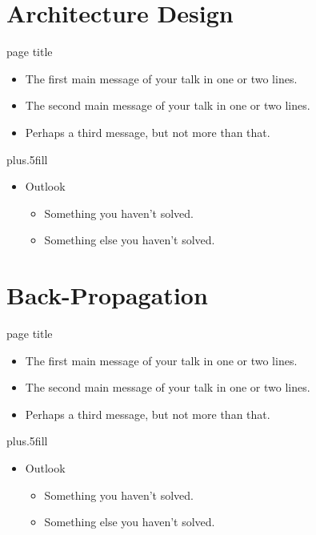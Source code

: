 \documentclass{beamer}
\begin{document}
\section{Architecture Design}

\begin{frame}{page title}
	
	\begin{itemize}
		\item
		The \alert{first main message} of your talk in one or two lines.
		\item
		The \alert{second main message} of your talk in one or two lines.
		\item
		Perhaps a \alert{third message}, but not more than that.
	\end{itemize}
	
	\vskip0pt plus.5fill
	\begin{itemize}
		\item
		Outlook
		\begin{itemize}
			\item
			Something you haven't solved.
			\item
			Something else you haven't solved.
		\end{itemize}
	\end{itemize}
\end{frame}

\section{Back-Propagation}

\begin{frame}{page title}
	
	\begin{itemize}
		\item
		The \alert{first main message} of your talk in one or two lines.
		\item
		The \alert{second main message} of your talk in one or two lines.
		\item
		Perhaps a \alert{third message}, but not more than that.
	\end{itemize}
	
	\vskip0pt plus.5fill
	\begin{itemize}
		\item
		Outlook
		\begin{itemize}
			\item
			Something you haven't solved.
			\item
			Something else you haven't solved.
		\end{itemize}
	\end{itemize}
\end{frame}
\end{document}
